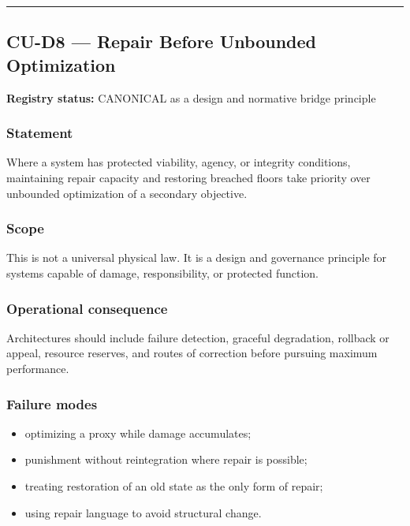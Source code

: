 \documentclass[
  11pt,
]{article}
\providecommand{\tightlist}{%
  \setlength{\itemsep}{0pt}\setlength{\parskip}{0pt}}
\begin{document}
\begin{center}\rule{0.5\linewidth}{0.5pt}\end{center}

\subsection{CU-D8 --- Repair Before Unbounded
Optimization}\label{cu-d8-repair-before-unbounded-optimization}

\textbf{Registry status:} CANONICAL as a design and normative bridge
principle

\subsubsection{Statement}\label{statement-48}

Where a system has protected viability, agency, or integrity conditions,
maintaining repair capacity and restoring breached floors take priority
over unbounded optimization of a secondary objective.

\subsubsection{Scope}\label{scope-22}

This is not a universal physical law. It is a design and governance
principle for systems capable of damage, responsibility, or protected
function.

\subsubsection{Operational
consequence}\label{operational-consequence-30}

Architectures should include failure detection, graceful degradation,
rollback or appeal, resource reserves, and routes of correction before
pursuing maximum performance.

\subsubsection{Failure modes}\label{failure-modes-21}

\begin{itemize}
\tightlist
\item
  optimizing a proxy while damage accumulates;
\item
  punishment without reintegration where repair is possible;
\item
  treating restoration of an old state as the only form of repair;
\item
  using repair language to avoid structural change.
\end{itemize}
\end{document}
